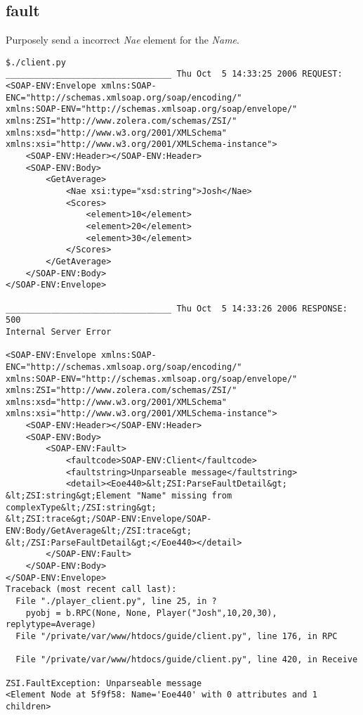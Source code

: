 \subsection{fault} Purposely send a incorrect \emph{Nae} element for the
\emph{Name}.
\begin{verbatim}
$./client.py 
_________________________________ Thu Oct  5 14:33:25 2006 REQUEST:
<SOAP-ENV:Envelope xmlns:SOAP-ENC="http://schemas.xmlsoap.org/soap/encoding/" 
xmlns:SOAP-ENV="http://schemas.xmlsoap.org/soap/envelope/" 
xmlns:ZSI="http://www.zolera.com/schemas/ZSI/" 
xmlns:xsd="http://www.w3.org/2001/XMLSchema" 
xmlns:xsi="http://www.w3.org/2001/XMLSchema-instance">
	<SOAP-ENV:Header></SOAP-ENV:Header>
	<SOAP-ENV:Body>
		<GetAverage>
			<Nae xsi:type="xsd:string">Josh</Nae>
			<Scores>
				<element>10</element>
				<element>20</element>
				<element>30</element>
			</Scores>
		</GetAverage>
	</SOAP-ENV:Body>
</SOAP-ENV:Envelope>

_________________________________ Thu Oct  5 14:33:26 2006 RESPONSE:
500
Internal Server Error

<SOAP-ENV:Envelope xmlns:SOAP-ENC="http://schemas.xmlsoap.org/soap/encoding/" 
xmlns:SOAP-ENV="http://schemas.xmlsoap.org/soap/envelope/" 
xmlns:ZSI="http://www.zolera.com/schemas/ZSI/" 
xmlns:xsd="http://www.w3.org/2001/XMLSchema" 
xmlns:xsi="http://www.w3.org/2001/XMLSchema-instance">
	<SOAP-ENV:Header></SOAP-ENV:Header>
	<SOAP-ENV:Body>
		<SOAP-ENV:Fault>
			<faultcode>SOAP-ENV:Client</faultcode>
			<faultstring>Unparseable message</faultstring>
			<detail><Eoe440>&lt;ZSI:ParseFaultDetail&gt;
&lt;ZSI:string&gt;Element "Name" missing from complexType&lt;/ZSI:string&gt;
&lt;ZSI:trace&gt;/SOAP-ENV:Envelope/SOAP-ENV:Body/GetAverage&lt;/ZSI:trace&gt;
&lt;/ZSI:ParseFaultDetail&gt;</Eoe440></detail>
		</SOAP-ENV:Fault>
	</SOAP-ENV:Body>
</SOAP-ENV:Envelope>
Traceback (most recent call last):
  File "./player_client.py", line 25, in ?
    pyobj = b.RPC(None, None, Player("Josh",10,20,30), replytype=Average)
  File "/private/var/www/htdocs/guide/client.py", line 176, in RPC
    
  File "/private/var/www/htdocs/guide/client.py", line 420, in Receive
    
ZSI.FaultException: Unparseable message
<Element Node at 5f9f58: Name='Eoe440' with 0 attributes and 1 children>
\end{verbatim}


